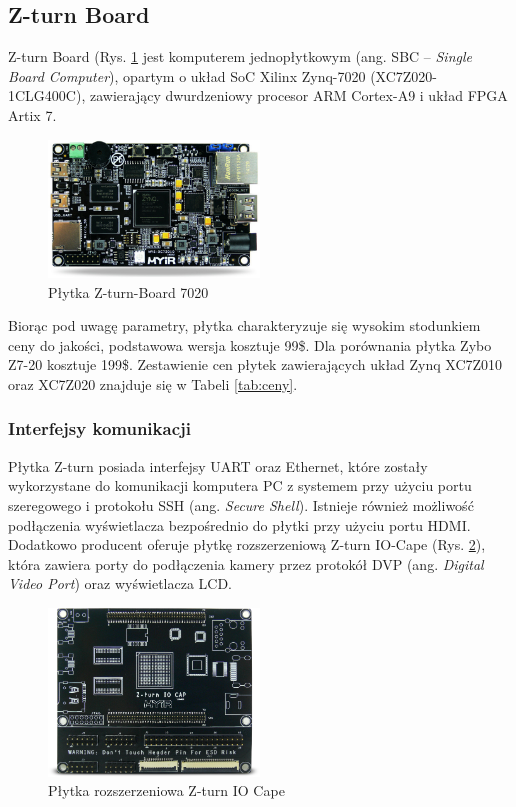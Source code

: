 \subsection{Z-turn Board}

Z-turn Board (Rys. \ref{zturn_board} jest komputerem jednopłytkowym (ang. SBC – \emph{Single Board Computer}),
opartym o układ SoC Xilinx Zynq-7020 (XC7Z020-1CLG400C), zawierający dwurdzeniowy 
procesor ARM Cortex-A9 i układ FPGA Artix 7. 

\begin{figure}[h]
  \centering
  \includegraphics[width=0.5\textwidth]{img/zturn_board.jpg}
  \caption{Płytka Z-turn-Board 7020}
  \label{zturn_board}
\end{figure}

Biorąc pod uwagę parametry, płytka 
charakteryzuje się wysokim stodunkiem ceny do jakości, podstawowa wersja kosztuje 
99\$. Dla porównania płytka Zybo Z7-20 kosztuje 199\$. Zestawienie cen płytek 
zawierających układ Zynq XC7Z010 oraz XC7Z020 znajduje się w Tabeli \ref{tab:ceny}. 

\subsubsection{Interfejsy komunikacji}

Płytka Z-turn posiada interfejsy UART oraz Ethernet, które zostały wykorzystane do 
komunikacji komputera PC z systemem przy użyciu portu szeregowego  
i protokołu SSH (ang. \emph{Secure Shell}). Istnieje również możliwość podłączenia 
wyświetlacza bezpośrednio do płytki przy użyciu portu HDMI. Dodatkowo producent 
oferuje płytkę rozszerzeniową Z-turn IO-Cape (Rys. \ref{iocape}), która zawiera 
porty do podłączenia kamery przez protokół DVP (ang. \emph{Digital Video Port}) 
oraz wyświetlacza LCD. 

\begin{figure}[h]
  \centering
  \includegraphics[width=0.5\textwidth]{img/iocape.png}
  \caption{Płytka rozszerzeniowa Z-turn IO Cape}
  \label{iocape}
\end{figure}

